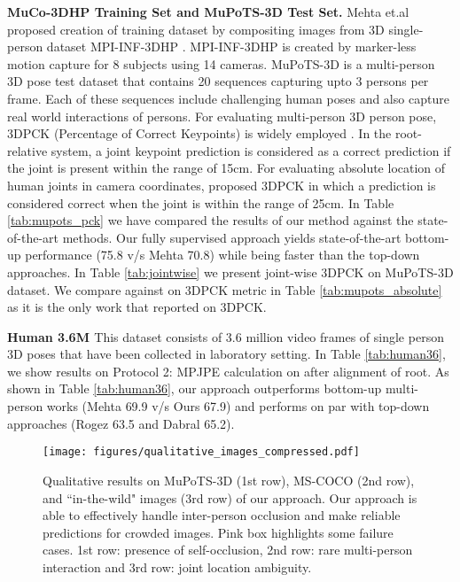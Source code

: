 \documentclass[runningheads]{llncs}
\begin{document}
\noindent\textbf{MuCo-3DHP Training Set and MuPoTS-3D Test Set.}
Mehta et.al \cite{mehta2018single} proposed creation of training dataset by compositing images from 3D single-person dataset MPI-INF-3DHP \cite{mehta2017monocular}. MPI-INF-3DHP is created by marker-less motion capture for 8 subjects using 14 cameras. MuPoTS-3D \cite{mehta2018single} is a multi-person 3D pose test dataset that contains 20 sequences capturing upto 3 persons per frame. Each of these sequences include challenging human poses and also capture real world interactions of persons. For evaluating multi-person 3D person pose, 3DPCK (Percentage of Correct Keypoints) is widely employed \cite{rogez2017lcr,mehta2018single,moon2019camera}. In the root-relative system, a joint keypoint prediction is considered as a correct prediction if the joint is present within the range of 15cm. For evaluating absolute location of human joints in camera coordinates, \cite{moon2019camera} proposed 3DPCK in which a prediction is considered correct when the joint is within the range of 25cm. 
In Table \ref{tab:mupots_pck} we have compared the results of our method against the state-of-the-art methods. Our fully supervised approach yields state-of-the-art bottom-up performance (75.8 v/s Mehta \cite{mehta2018single} 70.8) while being faster than the top-down approaches. In Table \ref{tab:jointwise} we present joint-wise 3DPCK on MuPoTS-3D dataset. We compare against \cite{moon2019camera} on 3DPCK metric in Table \ref{tab:mupots_absolute} as it is the only work that reported on 3DPCK. 

\textbf{Human 3.6M \cite{ionescu2013human3}} This dataset consists of 3.6 million video frames of single person 3D poses that have been collected in laboratory setting. 
In Table \ref{tab:human36}, we show results on Protocol 2: MPJPE calculation on after alignment of root. As shown in Table \ref{tab:human36}, our approach outperforms bottom-up multi-person works (Mehta \cite{mehta2018single} 69.9 v/s Ours 67.9) and performs on par with top-down approaches (Rogez \cite{rogez2019lcr} 63.5 and Dabral \cite{Dabral2019MultiPerson3H} 65.2). 



\begin{figure}[t]
    \centering
    \texttt{[image: figures/qualitative\_images\_compressed.pdf]}
   
    \caption{Qualitative results on MuPoTS-3D (1st row), MS-COCO (2nd row), and ``in-the-wild" images (3rd row) of our approach. Our approach is able to effectively handle inter-person occlusion and make reliable predictions for crowded images. Pink box highlights some failure cases. 1st row: presence of self-occlusion, 2nd row: rare multi-person interaction and 3rd row: joint location ambiguity. \vspace{-2mm}
    } 
    \label{fig:panel1} 

\end{figure}
\end{document}
